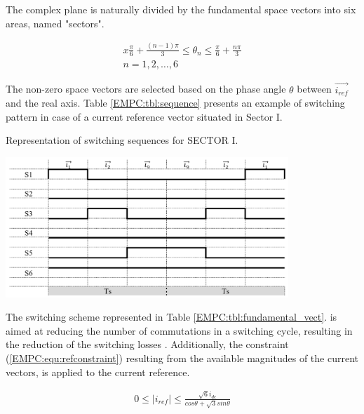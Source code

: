     The complex plane is naturally divided by the fundamental space vectors into six areas, named "sectors".

    \begin{equation}
        \begin{array}{l}
            x\frac{\pi}{6}+\frac{(n-1)\pi}{3}\leq\theta_n\leq\frac{\pi}{6}+\frac{n\pi}{3}\\
            n=1,2,\dots,6
        \end{array}
        \label{EMPC:equ:angle}
    \end{equation}

    The non-zero space vectors are selected based on the phase angle $\theta$ between $\overrightarrow{i_{ref}}$ and the real axis.
    Table \ref{EMPC:tbl:sequence} presents an example of switching pattern in case of a current reference vector situated in Sector I.

    \begin{table}[]
    
		\caption{Representation of switching sequences for SECTOR I.}
		\centering
        \includegraphics[width=0.8\textwidth]{EMPC_PNG_Pics/Sequence.png}
        
        \label{EMPC:tbl:sequence}
    \end{table}

    The switching scheme represented in Table \ref{EMPC:tbl:fundamental_vect}. is aimed at reducing the number of commutations in a switching cycle, resulting in the reduction of the switching losses \cite{moussaoui2005open}.
    Additionally, the constraint (\ref{EMPC:equ:refconstraint}) resulting from the available magnitudes of the current vectors, is applied to the current reference.

    \begin{equation}
        \begin{array}{l}
            0\leq|i_{ref}|\leq\frac{\sqrt{6}i_{dc}}{cos\theta+\sqrt{3}sin\theta}
        \end{array}
        \label{EMPC:equ:refconstraint}
    \end{equation}

